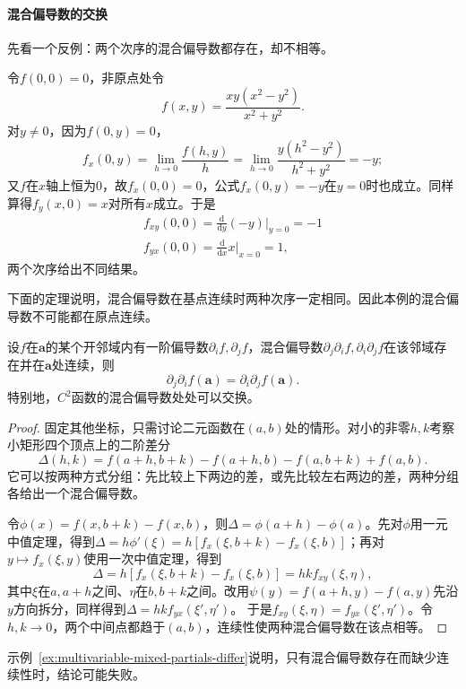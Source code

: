 \paragraph{混合偏导数的交换}
先看一个反例：两个次序的混合偏导数都存在，却不相等。
\begin{example}[混合偏导数与求导次序有关]
\label{ex:multivariable-mixed-partials-differ}
令$f(0,0)=0$，非原点处令
\[
 f(x,y)=\frac{xy(x^2-y^2)}{x^2+y^2}.
\]
对$y\neq0$，因为$f(0,y)=0$，
\[
 f_x(0,y)=\lim_{h\to0}\frac{f(h,y)}h=\lim_{h\to0}\frac{y(h^2-y^2)}{h^2+y^2}=-y;
\]
又$f$在$x$轴上恒为$0$，故$f_x(0,0)=0$，公式$f_x(0,y)=-y$在$y=0$时也成立。同样算得$f_y(x,0)=x$对所有$x$成立。于是
\[
 \begin{gathered}
f_{xy}(0,0)=\frac{\mathrm d}{\mathrm dy}(-y)\Big|_{y=0}=-1\\
f_{yx}(0,0)=\frac{\mathrm d}{\mathrm dx}x\Big|_{x=0}=1,
 \end{gathered}
\]
两个次序给出不同结果。
\end{example}

下面的定理说明，混合偏导数在基点连续时两种次序一定相同。因此本例的混合偏导数不可能都在原点连续。
\begin{theorem}[混合偏导数的交换]
\label{thm:multivariable-mixed-partials}
设$f$在$\bm a$的某个开邻域内有一阶偏导数$\partial_i f,\partial_j f$，混合偏导数$\partial_j\partial_i f,\partial_i\partial_j f$在该邻域存在并在$\bm a$处连续，则
\[
 \partial_j\partial_i f(\bm a)=\partial_i\partial_j f(\bm a).
\]
特别地，$C^2$函数的混合偏导数处处可以交换。
\end{theorem}
\begin{proof}
固定其他坐标，只需讨论二元函数在$(a,b)$处的情形。对小的非零$h,k$考察小矩形四个顶点上的二阶差分
\[
 \Delta(h,k)=f(a+h,b+k)-f(a+h,b)-f(a,b+k)+f(a,b).
\]
它可以按两种方式分组：先比较上下两边的差，或先比较左右两边的差，两种分组各给出一个混合偏导数。

令$\phi(x)=f(x,b+k)-f(x,b)$，则$\Delta=\phi(a+h)-\phi(a)$。先对$\phi$用一元中值定理，得到$\Delta=h\phi'(\xi)=h[f_x(\xi,b+k)-f_x(\xi,b)]$；再对$y\mapsto f_x(\xi,y)$使用一次中值定理，得到
\[
 \Delta=h[f_x(\xi,b+k)-f_x(\xi,b)]=hk f_{xy}(\xi,\eta),
\]
其中$\xi$在$a,a+h$之间、$\eta$在$b,b+k$之间。改用$\psi(y)=f(a+h,y)-f(a,y)$先沿$y$方向拆分，同样得到$\Delta=hk f_{yx}(\xi',\eta')$。
于是$f_{xy}(\xi,\eta)=f_{yx}(\xi',\eta')$。令$h,k\to0$，两个中间点都趋于$(a,b)$，连续性使两种混合偏导数在该点相等。
\end{proof}
示例~\ref{ex:multivariable-mixed-partials-differ}说明，只有混合偏导数存在而缺少连续性时，结论可能失败。

